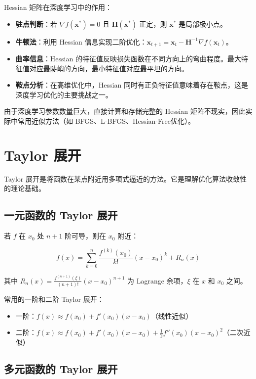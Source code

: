 Hessian 矩阵在深度学习中的作用：
\begin{itemize}
    \item \textbf{驻点判断}：若 $\nabla f(\mathbf{x}^*)=0$ 且 $\mathbf{H}(\mathbf{x}^*)$ 正定，则 $\mathbf{x}^*$ 是局部极小点。
    \item \textbf{牛顿法}：利用 Hessian 信息实现二阶优化：$\mathbf{x}_{t+1}=\mathbf{x}_t-\mathbf{H}^{-1}\nabla f(\mathbf{x}_t)$。
    \item \textbf{曲率信息}：Hessian 的特征值反映损失函数在不同方向上的弯曲程度。最大特征值对应最陡峭的方向，最小特征值对应最平坦的方向。
    \item \textbf{鞍点分析}：在高维优化中，Hessian 同时有正负特征值意味着存在鞍点，这是深度学习优化的主要挑战之一。
\end{itemize}

由于深度学习参数数量巨大，直接计算和存储完整的 Hessian 矩阵不现实，因此实际中常用近似方法（如 BFGS、L-BFGS、Hessian-Free优化）。

\section{Taylor 展开}

Taylor 展开是将函数在某点附近用多项式逼近的方法。它是理解优化算法收敛性的理论基础。

\subsection{一元函数的 Taylor 展开}

若 $f$ 在 $x_0$ 处 $n+1$ 阶可导，则在 $x_0$ 附近：

\[
f(x) = \sum_{k=0}^{n} \frac{f^{(k)}(x_0)}{k!}(x-x_0)^k + R_n(x)
\]

其中 $R_n(x)=\frac{f^{(n+1)}(\xi)}{(n+1)!}(x-x_0)^{n+1}$ 为 Lagrange 余项，$\xi$ 在 $x$ 和 $x_0$ 之间。

常用的一阶和二阶 Taylor 展开：
\begin{itemize}
    \item 一阶：$f(x)\approx f(x_0)+f'(x_0)(x-x_0)$（线性近似）
    \item 二阶：$f(x)\approx f(x_0)+f'(x_0)(x-x_0)+\frac{1}{2}f''(x_0)(x-x_0)^2$（二次近似）
\end{itemize}

\subsection{多元函数的 Taylor 展开}

